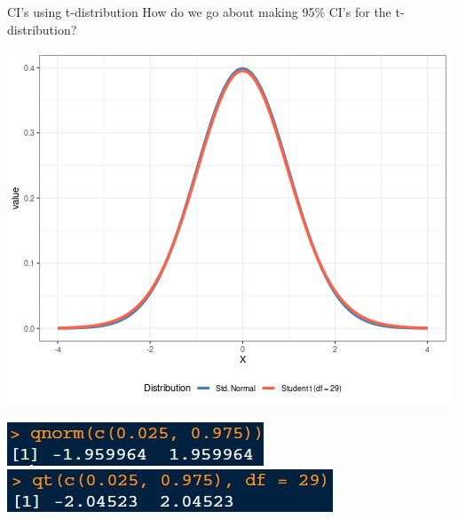 \documentclass{beamer}
\begin{document}
\begin{frame}{CI's using t-distribution}
How do we go about making 95\% CI's for the t-distribution?
\begin{center}
\includegraphics[scale=0.4]{t30.png}

\includegraphics[scale=.9]{img/qnorm1.jpg}
\includegraphics[scale=.9]{img/qnorm2.jpg}
\end{center}
\end{frame}
\end{document}
